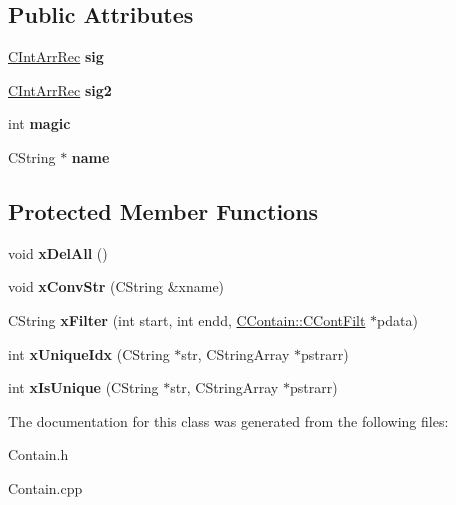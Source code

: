 \subsection*{Public Attributes}
\begin{DoxyCompactItemize}
\item 
\hypertarget{class_c_contain_ae7a1f8008a86f10386ebbaf428a4704e}{\hyperlink{class_c_int_arr_rec}{C\-Int\-Arr\-Rec} {\bfseries sig}}\label{class_c_contain_ae7a1f8008a86f10386ebbaf428a4704e}

\item 
\hypertarget{class_c_contain_a88c6d41b0303bac8f5193b91ec3166d2}{\hyperlink{class_c_int_arr_rec}{C\-Int\-Arr\-Rec} {\bfseries sig2}}\label{class_c_contain_a88c6d41b0303bac8f5193b91ec3166d2}

\item 
\hypertarget{class_c_contain_a25598ff8d1a88301aded3c3beea1da27}{int {\bfseries magic}}\label{class_c_contain_a25598ff8d1a88301aded3c3beea1da27}

\item 
\hypertarget{class_c_contain_a7d9c9a721efdcea12adfa3b0bdf35122}{C\-String $\ast$ {\bfseries name}}\label{class_c_contain_a7d9c9a721efdcea12adfa3b0bdf35122}

\end{DoxyCompactItemize}
\subsection*{Protected Member Functions}
\begin{DoxyCompactItemize}
\item 
\hypertarget{class_c_contain_a2b57746946c945598f44e9745ffcec3d}{void {\bfseries x\-Del\-All} ()}\label{class_c_contain_a2b57746946c945598f44e9745ffcec3d}

\item 
\hypertarget{class_c_contain_a4dcfa10cc379f06b41531023cbfadfeb}{void {\bfseries x\-Conv\-Str} (C\-String \&xname)}\label{class_c_contain_a4dcfa10cc379f06b41531023cbfadfeb}

\item 
\hypertarget{class_c_contain_a5756a4450f06c69e2c1d012a86de1b16}{C\-String {\bfseries x\-Filter} (int start, int endd, \hyperlink{class_c_contain_1_1_c_cont_filt}{C\-Contain\-::\-C\-Cont\-Filt} $\ast$pdata)}\label{class_c_contain_a5756a4450f06c69e2c1d012a86de1b16}

\item 
\hypertarget{class_c_contain_a0f2a51a168f70df2d9f1ee68cb97bc47}{int {\bfseries x\-Unique\-Idx} (C\-String $\ast$str, C\-String\-Array $\ast$pstrarr)}\label{class_c_contain_a0f2a51a168f70df2d9f1ee68cb97bc47}

\item 
\hypertarget{class_c_contain_a3f0dfbcb9ec788e3983ea1fb635fea79}{int {\bfseries x\-Is\-Unique} (C\-String $\ast$str, C\-String\-Array $\ast$pstrarr)}\label{class_c_contain_a3f0dfbcb9ec788e3983ea1fb635fea79}

\end{DoxyCompactItemize}


The documentation for this class was generated from the following files\-:\begin{DoxyCompactItemize}
\item 
Contain.\-h\item 
Contain.\-cpp\end{DoxyCompactItemize}
